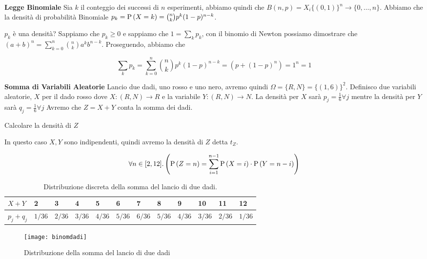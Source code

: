 \begin{defn}
	\textbf{Legge Binomiale} 
	Sia $ k $ il conteggio dei successi di $ n $ esperimenti, abbiamo quindi che $ B(n,p) = X_i\{(0,1)\}^n \to \{0, \dots, n\} $. Abbiamo che la densità di probabilità Binomiale $ p_k = \text{P}\left(X=k\right) = \binom{n}{k} p^k(1-p)^{n-k} $.
	
	$ p_k $ è una densità? Sappiamo che $ p_k \geq 0 $ e sappiamo che $ 1 = \sum_{k} p_k $, con il binomio di Newton possiamo dimostrare che $ (a+b)^n = \sum_{k=0}^{n} \binom{n}{k} a^k b^{n-k} $. Proseguendo, abbiamo che 
	
	\begin{equation*}
		\sum_{k} p_k = \sum_{k=0}^{n} \binom{n}{k} p^k (1-p)^{n-k} = (p+(1-p)^n) = 1^n = 1
	\end{equation*}
\end{defn}

\begin{defn}
	\textbf{Somma di Variabili Aleatorie}
	Lancio due dadi, uno rosso e uno nero, avremo quindi $ \Omega = \{R, N\} = \{(1,6)\}^2 $. Definisco due variabili aleatorie, $ X $ per il dado rosso dove $ X : (R, N) \to R $ e la variabile $ Y : (R, N) \to N $. La densità per $ X $ sarà $ p_j = \frac{1}{6} \forall j $ mentre la densità per $ Y $ sarà $ q_j = \frac{1}{6} \forall j $
	Avremo che $ Z = X + Y $ conta la somma dei dadi.
\end{defn}

\begin{exmp}
	Calcolare la densità di $ Z $
	
	In questo caso $ X, Y $ sono indipendenti, quindi avremo la densità di $ Z $ detta $ t_Z $.
	
	\begin{equation*}
	\forall n \in [2, 12] .  \left( \text{P}\left(Z = n\right) = \sum_{i=1}^{n-1} \text{P}\left(X = i\right) \cdot \text{P}\left(Y = n - i\right) \right)
	\end{equation*}
	
	\begin{table}[H]
		\centering
		\caption{Distribuzione discreta della somma del lancio di due dadi.}
		\label{tab:distribdice1}
		\begin{tabular}{|l|l|l|l|l|l|l|l|l|l|l|l|}
			\hline
			$ X + Y $     & 2        & 3        & 4        & 5        & 6        & 7        & 8        & 9        & 10       & 11       & 12       \\ \hline
			$ p_j + q_j $ & $ 1/36 $ & $ 2/36 $ & $ 3/36 $ & $ 4/36 $ & $ 5/36 $ & $ 6/36 $ & $ 5/36 $ & $ 4/36 $ & $ 3/36 $ & $ 2/36 $ & $ 1/36 $ \\ \hline
		\end{tabular}
	\end{table}
	
	\begin{figure}[H]
		\centering
		\caption{Distribuzione della somma del lancio di due dadi}
		\texttt{[image: binomdadi]}
	\end{figure}
\end{exmp}

